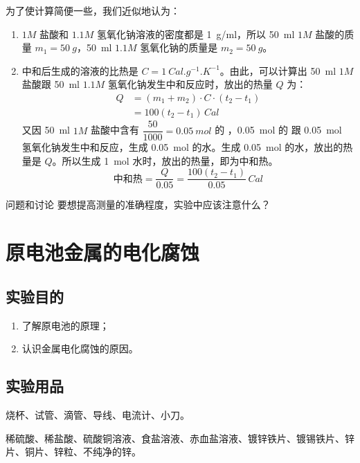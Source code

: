 \begin{enumerate}[1.]
  为了使计算简便一些，我们近似地认为：
  \begin{enumerate}[(1)]
    \item $1M$ 盐酸和 $1.1M$ 氢氧化钠溶液的密度都是 \qty{1}{g/ml}，所以 \qty{50}{ml} $1M$ 盐酸的质量 $m_1=\qty{50}{g}$，\qty{50}{ml} $1.1M$ 氢氧化钠的质量是 $m_2=\qty{50}{g}$。
    \item 中和后生成的溶液的比热是 $C=\qty{1}{Cal.g^{-1}.K^{-1}}$。由此，可以计算出 \qty{50}{ml} $1M$ 盐酸跟 \qty{50}{ml} $1.1M$ 氢氧化钠发生中和反应时，放出的热量 $Q$ 为：
    \begin{align*}
      Q &=(m_1+m_2)\cdot C \cdot (t_2-t_1)\\
      &=100(t_2-t_1)\,\unit{Cal}
    \end{align*}
    又因 \qty{50}{ml} $1M$ 盐酸中含有 $\dfrac{50}{1000} = \qty{0.05}{mol}$ 的 ，\qty{0.05}{mol} 的  跟 \qty{0.05}{mol} 氢氧化钠发生中和反应，生成 \qty{0.05}{mol} 的水。生成 \qty{0.05}{mol} 的水，放出的热量是 $Q$。所以生成 \qty{1}{mol} 水时，放出的热量，即为中和热。
    \[\text{中和热}=\frac{Q}{0.05}=\frac{100(t_2-t_1)}{0.05}\,\unit{Cal}\]
  \end{enumerate}
\end{enumerate}
\begin{Theorem}{问题和讨论}
要想提高测量的准确程度，实验中应该注意什么？
\end{Theorem}


\section{原电池\texorpdfstring{\quad}{ }金属的电化腐蚀}
\subsection*{实验目的}
\begin{enumerate}[1.]
  \item 了解原电池的原理；
  \item 认识金属电化腐蚀的原因。
\end{enumerate}
\subsection*{实验用品}
烧杯、试管、滴管、导线、电流计、小刀。

稀硫酸、稀盐酸、硫酸铜溶液、食盐溶液、赤血盐溶液、镀锌铁片、镀锡铁片、锌片、铜片、锌粒、不纯净的锌。


